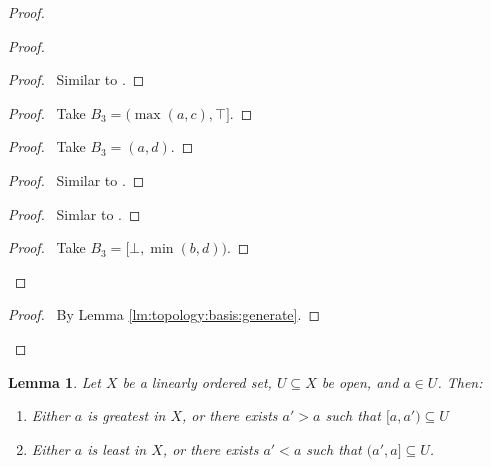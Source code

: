 \documentclass{report}
\let\qed\relax
\newtheorem{lm}{Lemma}[section]
\theoremstyle{definition}
\begin{document}
\begin{proof}
\begin{proof}
      \begin{proof}
        \pf\ Similar to .
      \end{proof}
      \step{<2>6}{\case{$B_1 = (a, \top], B_2 = (c, \top]$}}
      \begin{proof}
        \pf\ Take $B_3 = (\max(a, c), \top]$.
      \end{proof}
      \step{<2>7}{\case{$B_1 = (a, \top], B_2 = [\bot, d)$}}
      \begin{proof}
        \pf\ Take $B_3 = (a, d)$.
      \end{proof}
      \step{<2>8}{\case{$B_1 = [\bot, b), B_2 = (c, d)$}}
      \begin{proof}
        \pf\ Similar to .
      \end{proof}
      \begin{proof}
        \pf\ Simlar to .
      \end{proof}
      \step{<2>10}{\case{$B_1 = [\bot, b), B_2 = [\bot, d)$}}
      \begin{proof}
        \pf\ Take $B_3 = [\bot, \min(b, d))$.
      \end{proof}
    \end{proof}
    \qedstep
    \begin{proof}
      \pf\ By Lemma \ref{lm:topology:basis:generate}.
    \end{proof}
    \qed
  \end{proof}

      \begin{lm}
    \label{lm:topology:order:open}
    Let $X$ be a linearly ordered set, $U \subseteq X$ be open, and $a \in U$.
    Then:
    \begin{enumerate}
      \item Either $a$ is greatest in $X$, or there exists $a' > a$ such that
      $[a,
      a') \subseteq U$
      \item Either $a$ is least in $X$, or there exists $a' < a$ such that
      $(a',
      a]
      \subseteq U$.
    \end{enumerate}
  \end{lm}
\end{document}
